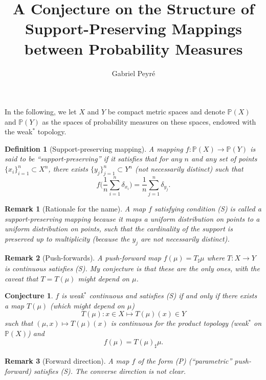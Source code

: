 \documentclass{article}
\title{A Conjecture on the Structure of Support-Preserving Mappings \\ between Probability Measures}
\author{Gabriel Peyré}
\newtheorem{remark}{Remark}
\newtheorem{defn}{Definition}
\newtheorem{conjecture}{Conjecture}
\begin{document}
\maketitle

In the following, we let \( X \) and \( Y \) be compact metric spaces and denote $\mathbb{P}(X)$ and $\mathbb{P}(Y)$ as the spaces of probability measures on these spaces, endowed with the weak$^*$ topology.

\begin{defn}[Support-preserving mapping]
A mapping \( f : \mathbb{P}(X) \to \mathbb{P}(Y) \) is said to be ``support-preserving'' if it satisfies that for any $n$ and any set of points $\{x_i\}_{i=1}^n \subset X^n$, there exists $\{y_j\}_{j=1}^n \subset Y^n$ (not necessarily distinct) such that 
\[
f\Big( \frac{1}{n} \sum_{i=1}^n \delta_{x_i} \Big) = \frac{1}{n} \sum_{j=1}^n \delta_{y_j}.  \tag{S}
\]
\end{defn}

\begin{remark}[Rationale for the name]
A map \( f \) satisfying condition (S) is called a \textit{support-preserving mapping} because it maps a uniform distribution on points to a uniform distribution on points, such that the cardinality of the support is preserved up to multiplicity (because the $y_j$ are not necessarily distinct). 
\end{remark}

\begin{remark}[Push-forwards]
A push-forward map \( f(\mu) = T_{\sharp} \mu \) where \( T : X \to Y \) is continuous satisfies (S). My conjecture is that these are the only ones, with the caveat that \( T = T(\mu) \) might depend on \( \mu \).
\end{remark}

\begin{conjecture}
\( f \) is weak\(^*\) continuous and satisfies (S) if and only if there exists a map \( T(\mu) \) (which might depend on \( \mu \))
\[
T(\mu) : x \in X \mapsto T(\mu)(x) \in Y
\]
such that \( (\mu, x) \mapsto T(\mu)(x) \) is continuous for the product topology (weak\(^*\) on \( \mathbb{P}(X) \)) and
\[
f(\mu) = T(\mu)_{\sharp} \mu. \tag{P}
\]
\end{conjecture}

\begin{remark}[Forward direction]
A map \( f \) of the form (P) (``parametric'' push-forward) satisfies (S). The converse direction is not clear.
\end{remark}
\end{document}
